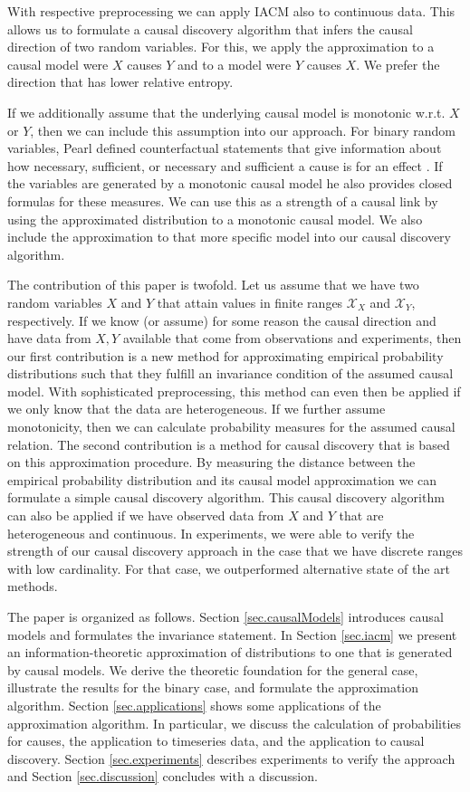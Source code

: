 \documentclass[letterpaper]{article}
\newcommand{\kX}{\mathcal{X}}   %
\begin{document}
With respective preprocessing we can apply IACM also to continuous data. This allows us to formulate a causal discovery algorithm that infers the causal direction of two random variables. For this, we apply the approximation to a causal model were $X$ causes $Y$ and to a model were $Y$ causes $X$. We prefer the direction that has lower relative entropy.

If we additionally assume that the underlying causal model is monotonic w.r.t. $X$ or $Y$, then we can include this assumption into our approach. For binary random variables, Pearl defined counterfactual statements that give information about how necessary, sufficient, or necessary and sufficient a cause is for an effect \cite{Pea09}. If the variables are generated by a monotonic causal model he also provides closed formulas for these measures. We can use this as a strength of a causal link by using the approximated distribution to a monotonic causal model. We also include the approximation to that more specific model into our causal discovery algorithm.

The contribution of this paper is twofold. Let us assume that we have two random variables $X$ and $Y$ that attain values in finite ranges $\kX_X$ and $\kX_Y$, respectively. If we know (or assume) for some reason the causal direction and have data from $X, Y$ available that come from observations and experiments, then our first contribution is a new method for approximating empirical probability distributions such that they fulfill an invariance condition of the assumed causal model. With sophisticated preprocessing, this method can even then be applied if we only know that the data are heterogeneous. If we further assume monotonicity, then we can calculate probability measures for the assumed causal relation. The second contribution is a method for causal discovery that is based on this approximation procedure. By measuring the distance between the empirical probability distribution and its causal model approximation we can formulate a simple causal discovery algorithm. This causal discovery algorithm can also be applied if we have observed data from $X$ and $Y$ that are heterogeneous and continuous. In experiments, we were able to verify the strength of our causal discovery approach in the case that we have discrete ranges with low cardinality. For that case, we outperformed alternative state of the art methods.

The paper is organized as follows. Section \ref{sec.causalModels} introduces causal models and formulates the invariance statement. In Section \ref{sec.iacm} we present an information-theoretic
approximation of distributions to one that is generated by causal models. We derive the theoretic foundation for the general case, illustrate the results for the binary case, and formulate the approximation algorithm. Section \ref{sec.applications} shows some applications of the approximation algorithm. In particular, we discuss the calculation of probabilities for causes, the application to timeseries data, and the application to causal discovery. Section \ref{sec.experiments} describes experiments to verify the approach and Section \ref{sec.discussion} concludes with a discussion.
\end{document}

